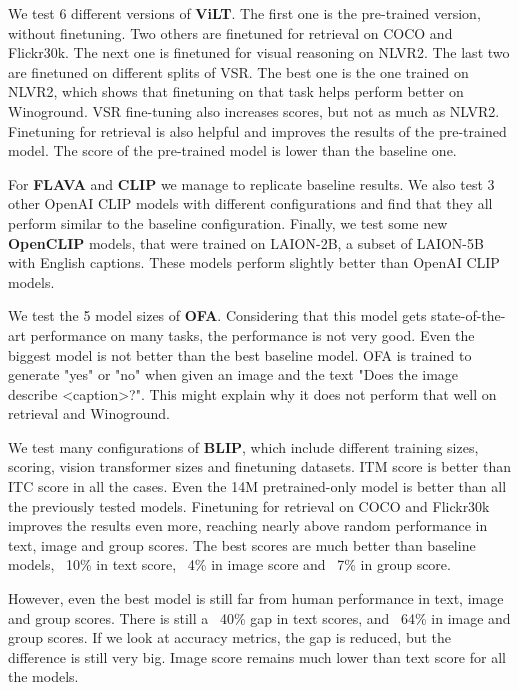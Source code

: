 We test 6 different versions of \textbf{ViLT}. The first one is the pre-trained version, without finetuning. Two others are finetuned for retrieval on COCO and Flickr30k. The next one is finetuned for visual reasoning on NLVR2. The last two are finetuned on different splits of VSR. The best one is the one trained on NLVR2, which shows that finetuning on that task helps perform better on Winoground. VSR fine-tuning also increases scores, but not as much as NLVR2. Finetuning for retrieval is also helpful and improves the results of the pre-trained model. The score of the pre-trained model is lower than the baseline one.

For \textbf{FLAVA} and \textbf{CLIP} we manage to replicate baseline results. We also test 3 other OpenAI CLIP \cite{radford2021clip} models with different configurations and find that they all perform similar to the baseline configuration. Finally, we test some new \textbf{OpenCLIP} \cite{ilharco_gabriel_2021_5143773} models, that were trained on LAION-2B, a subset of LAION-5B \cite{schuhmann2022laionb} with English captions. These models perform slightly better than OpenAI CLIP models.

We test the 5 model sizes of \textbf{OFA}. Considering that this model gets state-of-the-art performance on many tasks, the performance is not very good. Even the biggest model is not better than the best baseline model. OFA is trained to generate "yes" or "no" when given an image and the text "Does the image describe <caption>?". This might explain why it does not perform that well on retrieval and Winoground.

We test many configurations of \textbf{BLIP}, which include different training sizes, scoring, vision transformer sizes and finetuning datasets. ITM score is better than ITC score in all the cases. Even the 14M pretrained-only model is better than all the previously tested models. Finetuning for retrieval on COCO and Flickr30k improves the results even more, reaching nearly above random performance in text, image and group scores. The best scores are much better than baseline models, ~10\% in text score, ~4\% in image score and ~7\% in group score.

However, even the best model is still far from human performance in text, image and group scores. There is still a ~40\% gap in text scores, and ~64\% in image and group scores. If we look at accuracy metrics, the gap is reduced, but the difference is still very big. Image score remains much lower than text score for all the models.

